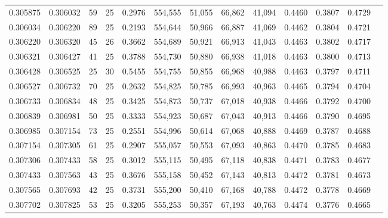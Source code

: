 \begin{tabular}{rrrrrrrrrrrrr}
0.305875 & 0.306032 &    59 &  25 &                                     0.2976 & 554,555 &  51,055 &  66,862 &  41,094 & 0.4460 & 0.3807 & 0.4729 \\
0.306034 & 0.306220 &    89 &  25 &                                     0.2193 & 554,644 &  50,966 &  66,887 &  41,069 & 0.4462 & 0.3804 & 0.4721 \\
0.306220 & 0.306320 &    45 &  26 &                                     0.3662 & 554,689 &  50,921 &  66,913 &  41,043 & 0.4463 & 0.3802 & 0.4717 \\
0.306321 & 0.306427 &    41 &  25 &                                     0.3788 & 554,730 &  50,880 &  66,938 &  41,018 & 0.4463 & 0.3800 & 0.4713 \\
0.306428 & 0.306525 &    25 &  30 &                                     0.5455 & 554,755 &  50,855 &  66,968 &  40,988 & 0.4463 & 0.3797 & 0.4711 \\
0.306527 & 0.306732 &    70 &  25 &                                     0.2632 & 554,825 &  50,785 &  66,993 &  40,963 & 0.4465 & 0.3794 & 0.4704 \\
0.306733 & 0.306834 &    48 &  25 &                                     0.3425 & 554,873 &  50,737 &  67,018 &  40,938 & 0.4466 & 0.3792 & 0.4700 \\
0.306839 & 0.306981 &    50 &  25 &                                     0.3333 & 554,923 &  50,687 &  67,043 &  40,913 & 0.4466 & 0.3790 & 0.4695 \\
0.306985 & 0.307154 &    73 &  25 &                                     0.2551 & 554,996 &  50,614 &  67,068 &  40,888 & 0.4469 & 0.3787 & 0.4688 \\
0.307154 & 0.307305 &    61 &  25 &                                     0.2907 & 555,057 &  50,553 &  67,093 &  40,863 & 0.4470 & 0.3785 & 0.4683 \\
0.307306 & 0.307433 &    58 &  25 &                                     0.3012 & 555,115 &  50,495 &  67,118 &  40,838 & 0.4471 & 0.3783 & 0.4677 \\
0.307433 & 0.307563 &    43 &  25 &                                     0.3676 & 555,158 &  50,452 &  67,143 &  40,813 & 0.4472 & 0.3781 & 0.4673 \\
0.307565 & 0.307693 &    42 &  25 &                                     0.3731 & 555,200 &  50,410 &  67,168 &  40,788 & 0.4472 & 0.3778 & 0.4669 \\
0.307702 & 0.307825 &    53 &  25 &                                     0.3205 & 555,253 &  50,357 &  67,193 &  40,763 & 0.4474 & 0.3776 & 0.4665 \\

\end{tabular}
